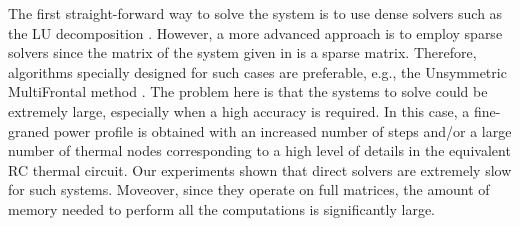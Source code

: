 The first straight-forward way to solve the system is to use dense solvers such as the LU decomposition \cite{press2007}. However, a more advanced approach is to employ sparse solvers since the matrix of the system given in  is a sparse matrix. Therefore, algorithms specially designed for such cases are preferable, e.g., the Unsymmetric MultiFrontal method \cite{umfpack2004}. The problem here is that the systems to solve could be extremely large, especially when a high accuracy is required. In this case, a fine-graned power profile is obtained with an increased number of steps and/or a large number of thermal nodes corresponding to a high level of details in the equivalent RC thermal circuit. Our experiments shown that direct solvers are extremely slow for such systems. Moveover, since they operate on full matrices, the amount of memory needed to perform all the computations is significantly large.
